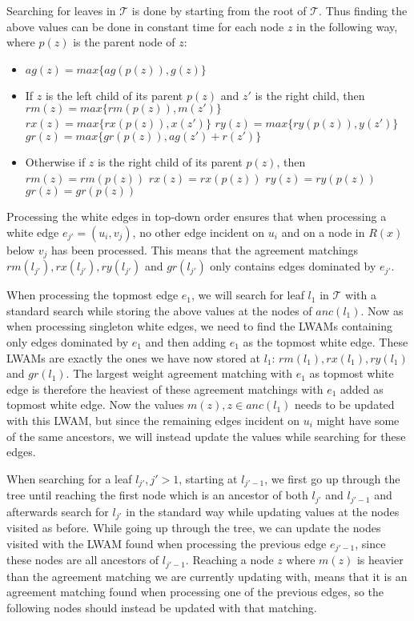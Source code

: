 Searching for leaves in $\mathcal{T}$ is done by starting from the root of $\mathcal{T}$. Thus finding the above values can be done in constant time for each node $z$ in the following way, where $p(z)$ is the parent node of $z$:
\begin{itemize}
	\item $ag(z) = max\{ag(p(z)), g(z)\}$
	\item If $z$ is the left child of its parent $p(z)$ and $z'$ is the right child, then
		\subitem $rm(z) = max\{rm(p(z)), m(z')\}$
		\subitem $rx(z) = max\{rx(p(z)), x(z')\}$
		\subitem $ry(z) = max\{ry(p(z)), y(z')\}$
		\subitem $gr(z) = max\{gr(p(z)), ag(z') + r(z')\}$
	\item Otherwise if $z$ is the right child of its parent $p(z)$, then
	\subitem $rm(z) = rm(p(z))$
	\subitem $rx(z) = rx(p(z))$
	\subitem $ry(z) = ry(p(z))$
	\subitem $gr(z) = gr(p(z))$
\end{itemize}

Processing the white edges in top-down order ensures that when processing a white edge $e_{j'}=(u_i,v_j)$, no other edge incident on $u_i$ and on a node in $R(x)$ below $v_j$ has been processed. This means that the agreement matchings $rm(l_{j'}), rx(l_{j'}), ry(l_{j'})$ and $gr(l_{j'})$ only contains edges dominated by $e_{j'}$.

When processing the topmost edge $e_1$, we will search for leaf $l_1$ in $\mathcal{T}$ with a standard search while storing the above values at the nodes of $anc(l_1)$. Now as when processing singleton white edges, we need to find the LWAMs containing only edges dominated by $e_1$ and then adding $e_1$ as the topmost white edge. These LWAMs are exactly the ones we have now stored at $l_1$: $rm(l_1), rx(l_1), ry(l_1)$ and $gr(l_1)$. The largest weight agreement matching with $e_1$ as topmost white edge is therefore the heaviest of these agreement matchings with $e_1$ added as topmost white edge. Now the values $m(z), z \in anc(l_1)$ needs to be updated with this LWAM, but since the remaining edges incident on $u_i$ might have some of the same ancestors, we will instead update the values while searching for these edges.

When searching for a leaf $l_{j'}, j' > 1$, starting at $l_{j'-1}$, we first go up through the tree until reaching the first node which is an ancestor of both $l_{j'}$ and $l_{j'-1}$ and afterwards search for $l_{j'}$ in the standard way while updating values at the nodes visited as before. While going up through the tree, we can update the nodes visited with the LWAM found when processing the previous edge $e_{j'-1}$, since these nodes are all ancestors of $l_{j'-1}$. Reaching a node $z$ where $m(z)$ is heavier than the agreement matching we are currently updating with, means that it is an agreement matching found when processing one of the previous edges, so the following nodes should instead be updated with that matching.

